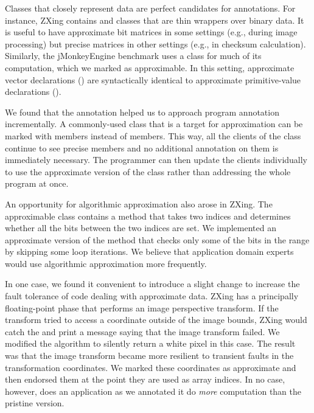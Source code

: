Classes that closely represent data are perfect candidates for
 annotations. For instance, ZXing contains
 and  classes that are thin wrappers over
binary data. It is useful to have approximate bit matrices in some settings (e.g.,
during image processing) but precise matrices in other settings (e.g., in
checksum calculation). Similarly, the jMonkeyEngine benchmark uses a
 class for much of its computation, which we marked
as approximable.
In this setting, approximate vector declarations
()
are syntactically identical to
approximate primitive-value declarations ().

We found that the  annotation helped us to approach program
annotation incrementally. A commonly-used class that is a target for
approximation can be marked with  members instead of
 members. This way, all the clients of the class continue to
see precise members and no additional annotation on them is immediately
necessary. The programmer can then update the clients individually to use the
approximate version of the class rather than addressing the whole program at
once.

An opportunity for algorithmic approximation also arose in ZXing. The
 approximable class contains a method  that
takes two indices and determines whether all the bits between the
two indices are set. We implemented an approximate version of the method that
checks only some of the bits in the range by skipping some loop iterations.
We believe that application domain experts would use algorithmic
approximation more frequently.

In one case, we found it convenient to introduce a slight change to increase the
fault tolerance of code dealing with approximate data. ZXing has a principally
floating-point phase that performs an image perspective transform. If the
transform tried to access a coordinate outside of the image bounds,
ZXing would catch the  and print a
message saying that the image transform failed. We modified the algorithm to
silently return a white pixel in this case. The result was that the image
transform became more resilient to transient faults in the transformation
coordinates. We marked these coordinates as
approximate and then endorsed them at the point they are used as array
indices.
In no case, however, does an application as we annotated it do
\emph{more} computation than the pristine version.



